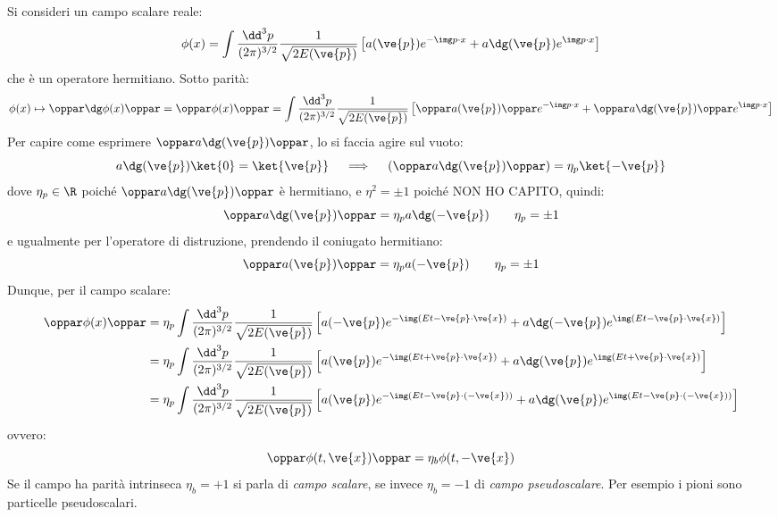 Si consideri un campo scalare reale:
\begin{equation*}
  \phi(x) = \int \frac{\dd^3p}{(2\pi)^{3/2}} \frac{1}{\sqrt{2E(\ve{p})}} \left[ a(\ve{p}) e^{-\img p \cdot x} + a\dg(\ve{p}) e^{\img p \cdot x} \right]
\end{equation*}
che è un operatore hermitiano. Sotto parità:
\begin{equation*}
  \phi(x) \mapsto \oppar\dg \phi(x) \oppar = \oppar \phi(x) \oppar = \int \frac{\dd^3p}{(2\pi)^{3/2}} \frac{1}{\sqrt{2E(\ve{p})}} \left[ \oppar a(\ve{p}) \oppar e^{-\img p \cdot x} + \oppar a\dg(\ve{p}) \oppar e^{\img p \cdot x} \right]
\end{equation*}
Per capire come esprimere $ \oppar a\dg(\ve{p}) \oppar $, lo si faccia agire sul vuoto:
\begin{equation*}
  a\dg(\ve{p}) \ket{0} = \ket{\ve{p}}
  \quad \implies \quad
  (\oppar a\dg(\ve{p}) \oppar) = \eta_p \ket{-\ve{p}}
\end{equation*}
dove $ \eta_p \in \R $ poiché $ \oppar a\dg(\ve{p}) \oppar $ è hermitiano, e $ \eta^2 = \pm 1 $ poiché NON HO CAPITO, quindi:
\begin{equation}
  \oppar a\dg(\ve{p}) \oppar = \eta_p a\dg(-\ve{p})
  \qquad
  \eta_p = \pm 1
  \label{eq:ad}
\end{equation}
e ugualmente per l'operatore di distruzione, prendendo il coniugato hermitiano:
\begin{equation}
  \oppar a(\ve{p}) \oppar = \eta_p a(-\ve{p})
  \qquad
  \eta_p = \pm 1
  \label{eq:a}
\end{equation}
Dunque, per il campo scalare:
\begin{equation}
  \begin{split}
    \oppar \phi(x) \oppar
    & = \eta_p \int \frac{\dd^3p}{(2\pi)^{3/2}} \frac{1}{\sqrt{2E(\ve{p})}} \left[ a(-\ve{p}) e^{-\img (E t - \ve{p} \cdot \ve{x})} + a\dg(-\ve{p}) e^{\img (E t - \ve{p} \cdot \ve{x})} \right] \\
    & = \eta_p \int \frac{\dd^3p}{(2\pi)^{3/2}} \frac{1}{\sqrt{2E(\ve{p})}} \left[ a(\ve{p}) e^{-\img (E t + \ve{p} \cdot \ve{x})} + a\dg(\ve{p}) e^{\img (E t + \ve{p} \cdot \ve{x})} \right] \\
    & = \eta_p \int \frac{\dd^3p}{(2\pi)^{3/2}} \frac{1}{\sqrt{2E(\ve{p})}} \left[ a(\ve{p}) e^{-\img (E t - \ve{p} \cdot (-\ve{x}))} + a\dg(\ve{p}) e^{\img (E t - \ve{p} \cdot (-\ve{x}))} \right] \\
  \end{split}
\end{equation}
ovvero:
\begin{equation}
  \oppar \phi(t,\ve{x}) \oppar = \eta_b \phi(t,-\ve{x})
\end{equation}
Se il campo ha parità intrinseca $ \eta_b = +1 $ si parla di \emph{campo scalare}, se invece $ \eta_b = -1 $ di \emph{campo pseudoscalare}. Per esempio i pioni sono particelle pseudoscalari.

